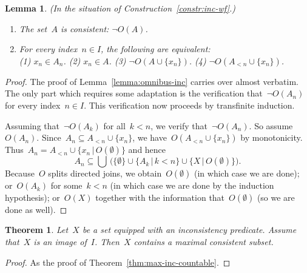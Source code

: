 \documentclass[com,11pt,crcready]{iosart2x}
\theoremstyle{definition}
\theoremstyle{plain}
\newtheorem{lemma}[definition]{Lemma}
\newtheorem{theorem}[definition]{Theorem}
\theoremstyle{remark}
\newcommand{\?}{\,{:}\,}
\renewcommand{\_}{\mathpunct{.}\,}
\begin{document}
\begin{lemma}\label{lemma:omnibus-inc-wf}(In the situation of
Construction~\ref{constr:inc-wf}.)
\begin{enumerate}
\item[(a)] The set~$A$ is consistent: $\neg O(A)$.
\item[(b)] For every index~$n \in I$, the following are equivalent: \\
(1) $x_n \in A_n$. \quad
(2) $x_n \in A$. \quad
(3) $\neg O(A\cup\{x_n\})$. \quad
(4) $\neg O(A_{<n} \cup \{x_n\})$.
\end{enumerate}\end{lemma}

\begin{proof}The proof of Lemma~\ref{lemma:omnibus-inc} carries over almost
verbatim. The only part which requires some adaptation is the verification
that~$\neg O(A_n)$ for every index~$n \in I$. This verification now proceeds by
transfinite induction.

Assuming that~$\neg O(A_k)$ for all~$k < n$, we verify that~$\neg O(A_n)$. So
assume~$O(A_n)$. Since~$A_n \subseteq A_{<n} \cup \{x_n\}$, we have~$O(A_{<n}
\cup \{x_n\})$ by monotonicity. Thus~$A_n = A_{<n} \cup
\{x_n\,|\,O(\emptyset)\}$ and hence
\[ A_n \subseteq \bigcup\,\bigl(\{ \emptyset \} \cup \{ A_k \,|\, k < n \} \cup
\{ X \,|\, O(\emptyset) \}\bigr). \]
Because~$O$ splits directed joins, we obtain~$O(\emptyset)$ (in which case we
are done); or~$O(A_k)$ for some~$k < n$ (in which case we are done by the
induction hypothesis); or~$O(X)$ together with the information
that~$O(\emptyset)$ (so we are done as well).
\end{proof}

\begin{theorem}\label{thm:max-inc-wf}Let~$X$ be a set equipped
with an inconsistency predicate. Assume that~$X$ is an image of~$I$.
Then~$X$ contains a maximal consistent subset.\end{theorem}

\begin{proof}As the proof of Theorem~\ref{thm:max-inc-countable}.\end{proof}


\nocite{label}

\end{document}
